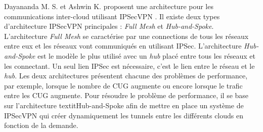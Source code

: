 Dayananda M. S. et Ashwin K. proposent une architecture pour les communications inter-cloud utilisant IPSecVPN \cite{archi_inter}. Il existe deux types d'architecture IPSecVPN principales : \textit{Full Mesh} et \textit{Hub-and-Spoke}. L'architecture \textit{Full Mesh} se caractérise par une connections de tous les réseaux entre eux et les réseaux vont communiqués en utilisant IPSec. L'architecture \textit{Hub-and-Spoke} est le modèle le plus utilisé avec un \textit{hub} placé entre tous les réseaux et les connectant. Un seul lien IPSec est nécessaire, c'est le lien entre le réseau et le \textit{hub}.
Les deux architectures présentent chacune des problèmes de performance, par exemple, lorsque le nombre de CUG augmente ou encore lorsque le trafic entre les CUG augmente. Pour résoudre le problème de performance, il se base sur l'architecture textit{Hub-and-Spoke} afin de mettre en place un système de IPSecVPN qui créer dynamiquement les tunnels entre les différents clouds en fonction de la demande.
\newline
